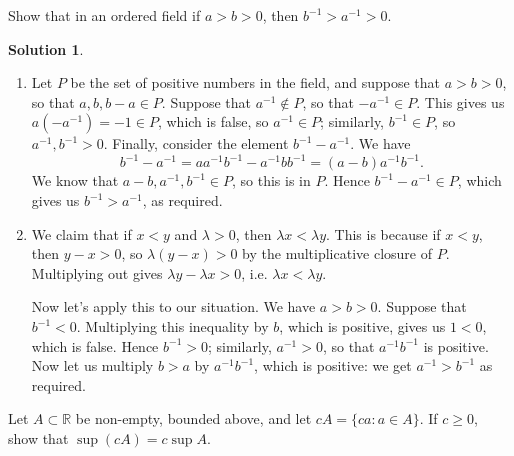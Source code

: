 \documentclass[12pt]{article}
\theoremstyle{definition}
\theoremstyle{definition}
\newtheorem*{soln}{Solution}
\newcommand{\R}{\mathbb{R}}
\begin{document}
\break

\begin{prob}
Show that in an ordered field if $a>b>0$, then $b^{-1}>a^{-1}>0$.
\end{prob}

\begin{soln}
\begin{enumerate}[label=\textbf{Method \arabic*.}]
\item Let $P$ be the set of positive numbers in the field, and suppose that $a>b>0$, so that $a,b,b-a\in P$. Suppose that $a^{-1}\notin P$, so that $-a^{-1}\in P$. This gives us $a(-a^{-1})=-1\in P$, which is false, so $a^{-1}\in P$; similarly, $b^{-1}\in P$, so $a^{-1},b^{-1}>0$. Finally, consider the element $b^{-1}-a^{-1}$. We have
\[b^{-1}-a^{-1} = aa^{-1}b^{-1}-a^{-1}bb^{-1}=(a-b)a^{-1}b^{-1}.\]
We know that $a-b,a^{-1},b^{-1}\in P$, so this is in $P$. Hence $b^{-1}-a^{-1}\in P$, which gives us $b^{-1}>a^{-1}$, as required.

\item We claim that if $x<y$ and $\lambda>0$, then $\lambda x<\lambda y$. This is because if $x<y$, then $y-x>0$, so $\lambda(y-x)>0$ by the multiplicative closure of $P$. Multiplying out gives $\lambda y-\lambda x>0$, i.e. $\lambda x<\lambda y$.

Now let's apply this to our situation. We have $a>b>0$. Suppose that $b^{-1}<0$. Multiplying this inequality by $b$, which is positive, gives us $1<0$, which is false. Hence $b^{-1}>0$; similarly, $a^{-1}>0$, so that $a^{-1}b^{-1}$ is positive. Now let us multiply $b>a$ by $a^{-1}b^{-1}$, which is positive: we get $a^{-1}>b^{-1}$ as required.
\end{enumerate}
\end{soln}


\break

\begin{prob}
Let $A\subset\R$ be non-empty, bounded above, and let $cA=\{ca:a\in A\}$. If $c\geq 0$, show that $\sup(cA)=c\sup A$.
\end{prob}
\end{document}
